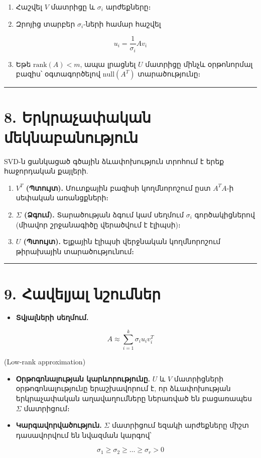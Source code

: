 \documentclass[12pt, a4paper]{article}
\begin{document}
\begin{enumerate}
    \item Հաշվել $V$ մատրիցը և $\sigma_i$ արժեքները։
    \item Զրոյից տարբեր $\sigma_i$-ների համար հաշվել
\end{enumerate}

$$
u_i = \frac{1}{\sigma_i} A v_i
$$

\begin{enumerate}
    \setcounter{enumi}{2}
    \item Եթե $\text{rank}(A) < m$, ապա լրացնել $U$ մատրիցը մինչև օրթոնորմալ բազիս՝ օգտագործելով $\text{null}(A^T)$ տարածությունը։
\end{enumerate}

\vspace{1em}
\hrule
\vspace{1em}

\section{8. Երկրաչափական մեկնաբանություն}

SVD-ն ցանկացած գծային ձևափոխություն տրոհում է երեք հաջորդական քայլերի.

\begin{enumerate}
    \item \textbf{$V^T$ (Պտույտ).} Մուտքային բազիսի կողմնորոշում ըստ $A^T A$-ի սեփական առանցքների։
    \item \textbf{$\Sigma$ (Ձգում).} Տարածության ձգում կամ սեղմում $\sigma_i$ գործակիցներով (միավոր շրջանագիծը վերածվում է էլիպսի)։
    \item \textbf{$U$ (Պտույտ).} Ելքային էլիպսի վերջնական կողմնորոշում թիրախային տարածությունում։
\end{enumerate}

\vspace{1em}
\hrule
\vspace{1em}

\section{9. Հավելյալ նշումներ}

\begin{itemize}
    \item \textbf{Տվյալների սեղմում.}
\end{itemize}

$$
A \approx \sum_{i=1}^{k} \sigma_i u_i v_i^T
$$

(Low-rank approximation)

\begin{itemize}
    \item \textbf{Օրթոգոնալության կարևորությունը.} $U$ և $V$ մատրիցների օրթոգոնալությունը երաշխավորում է, որ ձևափոխության երկրաչափական աղավաղումները ներառված են բացառապես $\Sigma$ մատրիցում։

    \item \textbf{Կարգավորվածություն.} $\Sigma$ մատրիցում եզակի արժեքները միշտ դասավորվում են նվազման կարգով՝
\end{itemize}

$$
\sigma_1 \ge \sigma_2 \ge \dots \ge \sigma_r > 0
$$
\end{document}
